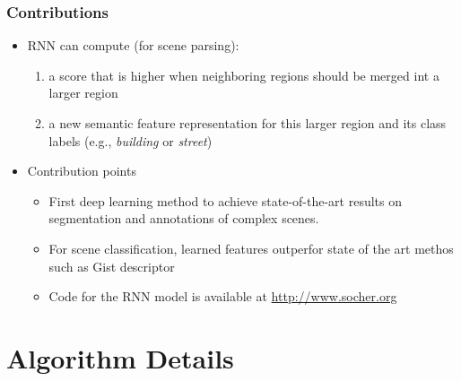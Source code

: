 \documentclass{beamer}
\begin{document}
\frame
{
	\frametitle{Contributions}
	\begin{itemize}
		\item RNN can compute (for scene parsing):
			\begin{enumerate}
			\item a score that is higher when neighboring regions should be merged int a larger region
			\item a new semantic feature representation for this larger region and its class labels (e.g., \textit{building} or \textit{street})
			\end{enumerate}
		\item Contribution points
			\begin{itemize}
			\item First deep learning method to achieve state-of-the-art results on segmentation and annotations of complex scenes. 
			\item For scene classification, learned features outperfor state of the art methos such as Gist descriptor 
			\item Code for the RNN model is available at \url{http://www.socher.org}
			\end{itemize}
	\end{itemize}
}
\section{Algorithm Details}
\end{document}
